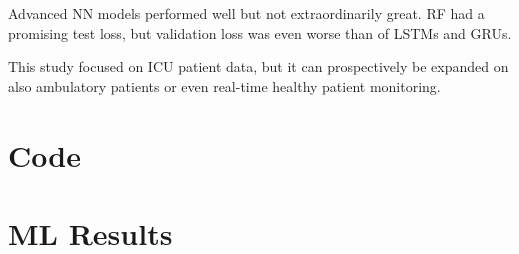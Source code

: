 \documentclass[12pt, bibliography=totoc]{scrartcl}
\begin{document}
    Advanced NN models performed well but not extraordinarily great.
    RF had a promising test loss, but validation loss was even worse than of LSTMs and GRUs.

    This study focused on ICU patient data, but it can prospectively be expanded on also ambulatory patients or even real-time healthy patient monitoring.

    \newpage

    \singlespacing
    \small
    
    \normalsize

    \newpage
    \appendix


    \section{Code}\label{sec:code}
    

    \newpage

    \section{ML Results}\label{sec:ml_results}
    
\end{document}
